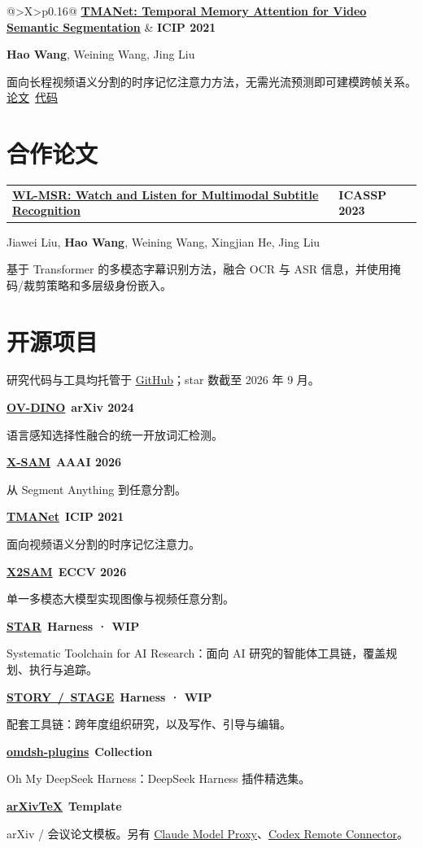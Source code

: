 \documentclass[UTF8,10pt,letterpaper,fontset=fandol,linespread=1.15]{ctexart}
\makeatletter
\newcommand{\metaline}[1]{\textcolor{muted}{\small #1}}
\newcommand{\venue}[1]{\textcolor{accent}{\footnotesize\bfseries #1}}
\newcommand{\stars}[1]{\ifstrempty{#1}{}{\hfill\textcolor{soft}{\footnotesize\faStar\,#1}}}
\newcommand{\sep}{{\color{rule}\;\textbar\;}}
\newcommand{\publication}[5]{%
  \par\addvspace{2pt}
  \noindent\begin{minipage}{\linewidth}
  \begin{tabularx}{\textwidth}{@{}>{\RaggedRight\arraybackslash}X>{\RaggedLeft\arraybackslash}p{0.16\textwidth}@{}}
    \textbf{\href{#1}{\textcolor{ink}{#2}}} & \venue{#3}
  \end{tabularx}\par
  \vspace{-1pt}
  {\small #4}\par
  \vspace{1pt}
  \textcolor{muted}{\small #5}\par
  \end{minipage}\par
  \vspace{8pt}
}
\newcommand{\repo}[5]{%
  \textbf{\href{#1}{\textcolor{ink}{#2}}}\ \venue{#3}\stars{#4}\par
  \vspace{-1pt}
  \textcolor{muted}{\small #5}\par
  \vspace{5pt}
}
\makeatother
\begin{document}
\publication
  {https://arxiv.org/abs/2102.08643}
  {TMANet: Temporal Memory Attention for Video Semantic Segmentation}
  {ICIP 2021}
  {\textbf{Hao Wang}, Weining Wang, Jing Liu}
  {面向长程视频语义分割的时序记忆注意力方法，无需光流预测即可建模跨帧关系。\mbox{\href{https://arxiv.org/abs/2102.08643}{论文} \sep \href{https://github.com/wanghao9610/TMANet}{代码}}}

\section{合作论文}
\publication
  {https://ieeexplore.ieee.org/abstract/document/10096063}
  {WL-MSR: Watch and Listen for Multimodal Subtitle Recognition}
  {ICASSP 2023}
  {Jiawei Liu, \textbf{Hao Wang}, Weining Wang, Xingjian He, Jing Liu}
  {基于 Transformer 的多模态字幕识别方法，融合 OCR 与 ASR 信息，并使用掩码/裁剪策略和多层级身份嵌入。}

\newpage
\section{开源项目}
\metaline{研究代码与工具均托管于 \href{https://github.com/wanghao9610}{GitHub}；star 数截至 2026 年 9 月。}\par
\vspace{4pt}
\begin{minipage}[t]{0.485\textwidth}
  \RaggedRight
  \repo{https://github.com/wanghao9610/OV-DINO}{OV-DINO}{arXiv 2024}{414}{语言感知选择性融合的统一开放词汇检测。}
  \repo{https://github.com/wanghao9610/X-SAM}{X-SAM}{AAAI 2026}{391}{从 Segment Anything 到任意分割。}
  \repo{https://github.com/wanghao9610/TMANet}{TMANet}{ICIP 2021}{128}{面向视频语义分割的时序记忆注意力。}
  \repo{https://github.com/wanghao9610/X2SAM}{X2SAM}{ECCV 2026}{104}{单一多模态大模型实现图像与视频任意分割。}
\end{minipage}%
\hfill
\begin{minipage}[t]{0.485\textwidth}
  \RaggedRight
  \repo{https://github.com/wanghao9610/STAR}{STAR}{Harness · WIP}{51}{Systematic Toolchain for AI Research：面向 AI 研究的智能体工具链，覆盖规划、执行与追踪。}
  \repo{https://github.com/wanghao9610/STORY}{STORY \,/\, \href{https://github.com/wanghao9610/STAGE}{STAGE}}{Harness · WIP}{}{配套工具链：跨年度组织研究，以及写作、引导与编辑。}
  \repo{https://omdsh-plugins.github.io/}{omdsh-plugins}{Collection}{}{Oh My DeepSeek Harness：DeepSeek Harness 插件精选集。}
  \repo{https://github.com/wanghao9610/arXivTeX}{arXivTeX}{Template}{33}{arXiv / 会议论文模板。另有 \href{https://github.com/wanghao9610/Claude-Model-Proxy}{Claude Model Proxy}、\href{https://github.com/wanghao9610/Codex-Remote-Connector}{Codex Remote Connector}。}
\end{minipage}
\end{document}
